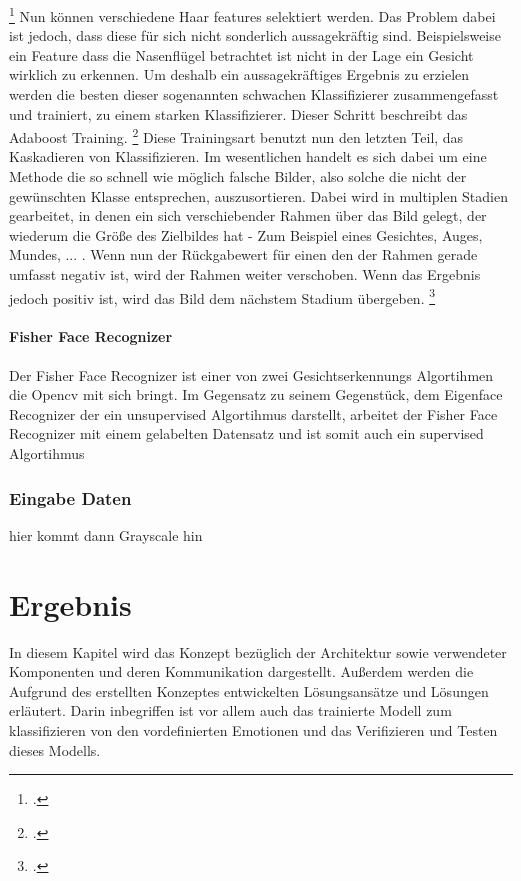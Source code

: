 \documentclass[12pt, a4paper]{scrbook}
\begin{document}
\footcite[Vgl.][]{integral}
Nun können verschiedene Haar features selektiert werden. Das Problem dabei ist jedoch, dass diese für sich nicht sonderlich aussagekräftig sind. Beispielsweise ein Feature dass die Nasenflügel betrachtet ist nicht in der Lage ein Gesicht wirklich zu erkennen. Um deshalb ein aussagekräftiges Ergebnis zu erzielen werden die besten dieser sogenannten schwachen Klassifizierer zusammengefasst und trainiert,  zu einem starken Klassifizierer. Dieser Schritt beschreibt das Adaboost Training.
\footcite[Vgl.][]{willberger}
Diese Trainingsart benutzt nun den letzten Teil, das Kaskadieren von Klassifizieren. Im wesentlichen handelt es sich dabei um eine Methode die so schnell wie möglich falsche Bilder, also solche die nicht der gewünschten Klasse entsprechen, auszusortieren. Dabei wird in multiplen Stadien gearbeitet, in denen	 ein sich verschiebender Rahmen über das Bild gelegt, der wiederum die Größe des Zielbildes hat - Zum Beispiel eines Gesichtes, Auges, Mundes, ... . Wenn nun der Rückgabewert für einen den der Rahmen gerade umfasst negativ ist, wird der Rahmen weiter verschoben. Wenn das Ergebnis jedoch positiv ist, wird das Bild dem nächstem Stadium übergeben. 
\footcite[Vgl.][]{willberger}
\subsubsection{Fisher Face Recognizer}
Der Fisher Face Recognizer ist einer von zwei Gesichtserkennungs Algortihmen die Opencv mit sich bringt. Im Gegensatz zu seinem Gegenstück, dem Eigenface Recognizer der ein unsupervised Algortihmus darstellt, arbeitet der Fisher Face Recognizer mit einem gelabelten Datensatz und ist somit auch ein supervised Algortihmus
\subsection{Eingabe Daten}
hier kommt dann Grayscale hin
\let\cleardoublepage\relax

\chapter{Ergebnis}
In diesem Kapitel wird das Konzept bezüglich der Architektur sowie verwendeter Komponenten und deren Kommunikation dargestellt. Außerdem werden die Aufgrund des erstellten Konzeptes entwickelten Lösungsansätze und Lösungen erläutert. Darin inbegriffen ist vor allem auch das trainierte Modell zum klassifizieren von den vordefinierten Emotionen und das Verifizieren und Testen dieses Modells.
\end{document}
